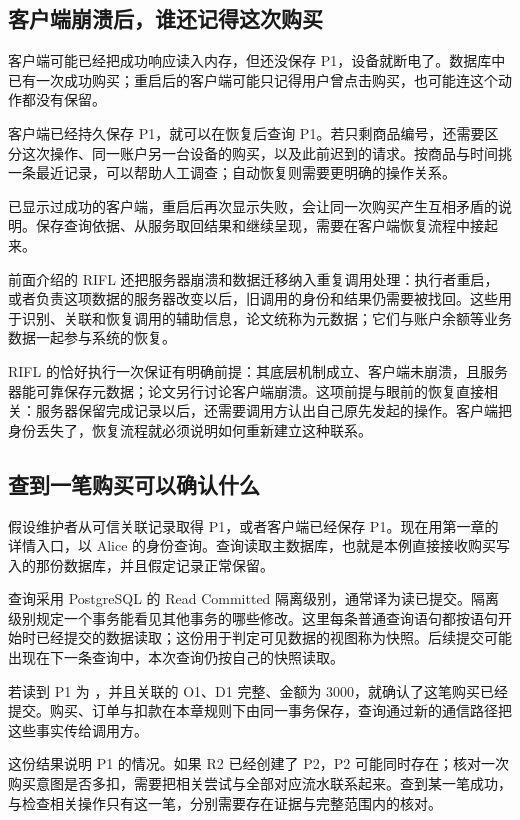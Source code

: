 \subsection*{客户端崩溃后，谁还记得这次购买}

客户端可能已经把成功响应读入内存，但还没保存 P1，设备就断电了。数据库中已有一次成功购买；重启后的客户端可能只记得用户曾点击购买，也可能连这个动作都没有保留。

客户端已经持久保存 P1，就可以在恢复后查询 P1。若只剩商品编号，还需要区分这次操作、同一账户另一台设备的购买，以及此前迟到的请求。按商品与时间挑一条最近记录，可以帮助人工调查；自动恢复则需要更明确的操作关系。

已显示过成功的客户端，重启后再次显示失败，会让同一次购买产生互相矛盾的说明。保存查询依据、从服务取回结果和继续呈现，需要在客户端恢复流程中接起来。

前面介绍的 RIFL 还把服务器崩溃和数据迁移纳入重复调用处理：执行者重启，或者负责这项数据的服务器改变以后，旧调用的身份和结果仍需要被找回\cite{rifl}。这些用于识别、关联和恢复调用的辅助信息，论文统称为元数据；它们与账户余额等业务数据一起参与系统的恢复。

RIFL 的恰好执行一次保证有明确前提：其底层机制成立、客户端未崩溃，且服务器能可靠保存元数据；论文另行讨论客户端崩溃\cite{rifl}。这项前提与眼前的恢复直接相关：服务器保留完成记录以后，还需要调用方认出自己原先发起的操作。客户端把身份丢失了，恢复流程就必须说明如何重新建立这种联系。

\subsection*{查到一笔购买可以确认什么}

假设维护者从可信关联记录取得 P1，或者客户端已经保存 P1。现在用第一章的详情入口，以 Alice 的身份查询。查询读取主数据库，也就是本例直接接收购买写入的那份数据库，并且假定记录正常保留。

查询采用 PostgreSQL 的 Read Committed 隔离级别，通常译为读已提交。隔离级别规定一个事务能看见其他事务的哪些修改。这里每条普通查询语句都按语句开始时已经提交的数据读取；这份用于判定可见数据的视图称为快照。后续提交可能出现在下一条查询中，本次查询仍按自己的快照读取。

若读到 P1 为 ，并且关联的 O1、D1 完整、金额为 3000，就确认了这笔购买已经提交。购买、订单与扣款在本章规则下由同一事务保存，查询通过新的通信路径把这些事实传给调用方。

这份结果说明 P1 的情况。如果 R2 已经创建了 P2，P2 可能同时存在；核对一次购买意图是否多扣，需要把相关尝试与全部对应流水联系起来。查到某一笔成功，与检查相关操作只有这一笔，分别需要存在证据与完整范围内的核对。

